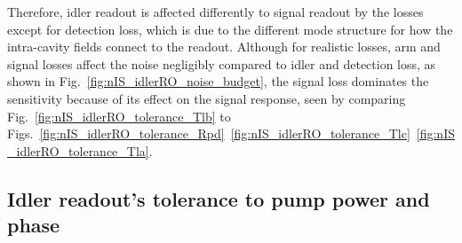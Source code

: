 
Therefore, idler readout is affected differently to signal readout by the losses except for detection loss, which is due to the different mode structure for how the intra-cavity fields connect to the readout.
Although for realistic losses, arm and signal losses affect the noise negligibly compared to idler and detection loss, as shown in Fig.~\ref{fig:nIS_idlerRO_noise_budget}, the signal loss dominates the sensitivity because of its effect on the signal response, seen by comparing Fig.~\ref{fig:nIS_idlerRO_tolerance_Tlb} to Figs.~\ref{fig:nIS_idlerRO_tolerance_Rpd}~\ref{fig:nIS_idlerRO_tolerance_Tlc}~\ref{fig:nIS_idlerRO_tolerance_Tla}. 


\subsection{Idler readout's tolerance to pump power and phase}

